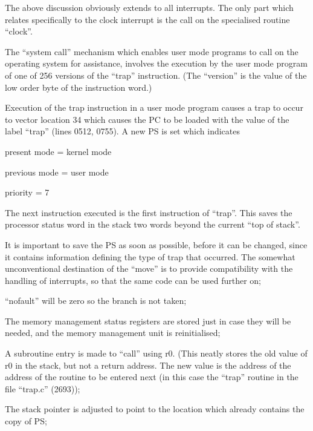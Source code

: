 The above discussion obviously extends
to all interrupts. The only part which
relates specifically to the clock
interrupt is the call on the specialised routine ``clock''.



The ``system call'' mechanism which
enables user mode programs to call on
the operating system for assistance,
involves the execution by the user mode
program of one of 256 versions of the
``trap'' instruction. (The ``version'' is
the value of the low order byte of the
instruction word.)

\bd
\item[0518:] Execution of the trap instruction in a user mode program
 causes a trap to occur to vector
 location 34 which causes the PC
 to be loaded with the value of
 the label ``trap'' (lines 0512,
 0755). A new PS is set which
 indicates

present mode = kernel mode

previous mode = user mode

priority = 7

\item[0756:] The next instruction executed is
 the first instruction of ``trap''.
 This saves the processor status
 word in the stack two words
 beyond the current ``top of
 stack''.

It is important to save the PS as
soon as possible, before it can
be changed, since it contains
information defining the type of
trap that occurred. The somewhat
unconventional destination of the
``move'' is to provide compatibility with the
handling of interrupts, so that the same code can
be used further on;

\item[0757:] ``nofault'' will be zero so the
 branch is not taken;

\item[0759:] The memory management status
registers are stored just in case
they will be needed, and the
memory management unit is reinitialised;

\item[0762:] A subroutine entry is made to
 ``call'' using r0. (This neatly
 stores the old value of r0 in the
 stack, but not a return address.
 The new value is the address of
 the address of the routine to be
 entered next (in this case the
 ``trap'' routine in the file
 ``trap.c'' (2693));

\item[0772:] The stack pointer is adjusted to
 point to the location which
 already contains the copy of PS;

